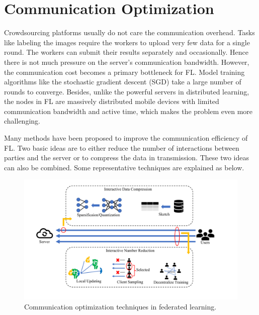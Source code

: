 \documentclass[11pt]{article}
\begin{document}
\section{Communication Optimization}

Crowdsourcing platforms usually do not care the communication overhead. 
Tasks like labeling the images require the workers to upload very few data for a single round. 
The workers can submit their results separately and occasionally.
Hence there is not much pressure on the server's communication bandwidth. 
However, the communication cost becomes a primary bottleneck for FL.
Model training algorithms like the stochastic gradient descent (SGD) take a large number of rounds to converge.
Besides, unlike the powerful servers in distributed learning, the nodes in FL are massively distributed mobile devices with limited communication bandwidth and active time, which makes the problem even more challenging.   

Many methods have been proposed to improve the communication efficiency of FL. 
Two basic ideas are to either reduce the number of interactions between parties and the server or to compress the data in transmission. 
These two ideas can also be combined.
Some representative techniques are explained as below.

\begin{figure}
\centering
\includegraphics[scale=0.4]{submissions/yongxin/figs/communication.pdf}
\caption{Communication optimization techniques in federated learning.}
\label{fig:communication}
\end{figure}
\end{document}
